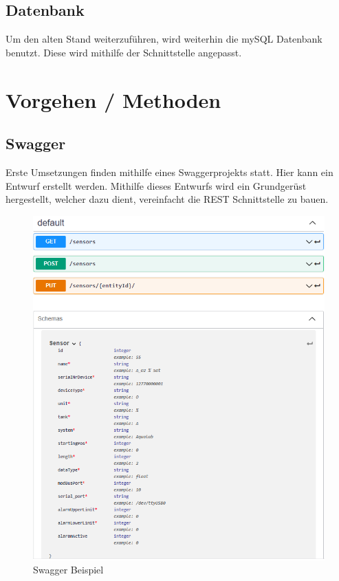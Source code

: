 \documentclass[a4paper]{article}
\begin{document}
	\subsection{Datenbank}
	Um den alten Stand weiterzuführen, wird weiterhin die mySQL Datenbank benutzt. Diese wird mithilfe der Schnittstelle angepasst.
	
	\section{Vorgehen / Methoden}
	
	\subsection{Swagger}
	Erste Umsetzungen finden mithilfe eines Swaggerprojekts statt. Hier kann ein Entwurf erstellt werden. Mithilfe dieses Entwurfs wird ein Grundgerüst hergestellt, welcher dazu dient, vereinfacht die REST Schnittstelle zu bauen.

	\begin{figure}[h]
		\centering
		\includegraphics[scale=0.4]{Swagger}
		\caption{Swagger Beispiel}
		\label{fig:Swagger}
	\end{figure}
\end{document}
